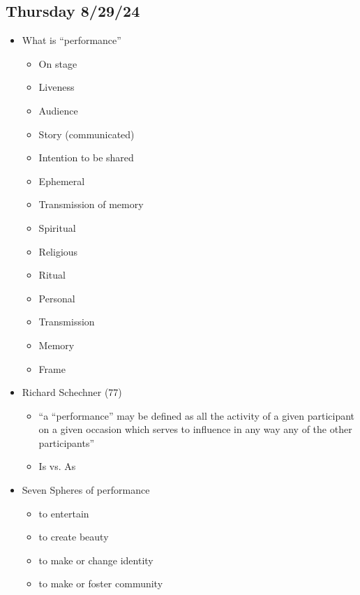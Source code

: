 \documentclass[12pt]{article}
\begin{document}
        \subsection{Thursday 8/29/24}
            \bigskip
            \begin{itemize}
                \item What is ``performance''
                \begin{itemize}
                    \item On stage
                    \item Liveness
                    \item Audience
                    \item Story (communicated)
                    \item Intention to be shared
                    \item Ephemeral
                    \item Transmission of memory
                    \item Spiritual
                    \item Religious
                    \item Ritual
                    \item Personal
                    \item Transmission
                    \item Memory
                    \item Frame
                \end{itemize}
                \item Richard Schechner (77)
                \begin{itemize}
                    \item ``a ``performance'' may be defined as all the activity of a given participant on a given occasion which serves to influence in any way any of the other participants''
                    \item Is vs. As
                \end{itemize}
                \pagebreak
                \item Seven Spheres of performance
                \begin{itemize}
                    \item to entertain
                    \item to create beauty
                    \item to make or change identity
                    \item to make or foster community

\end{itemize}
\end{itemize}
\end{document}
